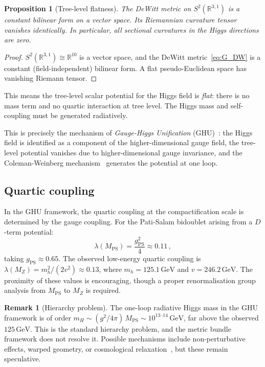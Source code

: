 \documentclass[12pt,a4paper]{article}
\newtheorem{proposition}[theorem]{Proposition}
\theoremstyle{definition}
\newtheorem{remark}[theorem]{Remark}
\newcommand{\R}{\mathbb{R}}
\begin{document}
\begin{proposition}[Tree-level flatness]
\label{prop:flat}
The DeWitt metric on $S^2(\R^{3,1})$ is a \emph{constant} bilinear form on a vector space.
Its Riemannian curvature tensor vanishes identically.
In particular, all sectional curvatures in the Higgs directions are zero.
\end{proposition}

\begin{proof}
$S^2(\R^{3,1}) \cong \R^{10}$ is a vector space, and the DeWitt metric~\eqref{eq:G_DW} is a constant (field-independent) bilinear form.
A flat pseudo-Euclidean space has vanishing Riemann tensor.
\end{proof}

This means the tree-level scalar potential for the Higgs field is \emph{flat}: there is no mass term and no quartic interaction at tree level.
The Higgs mass and self-coupling must be generated radiatively.

This is precisely the mechanism of \emph{Gauge-Higgs Unification} (GHU)~\cite{Hosotani1983,HatanakaHosotani1998}: the Higgs field is identified as a component of the higher-dimensional gauge field, the tree-level potential vanishes due to higher-dimensional gauge invariance, and the Coleman-Weinberg mechanism~\cite{ColemanWeinberg1973} generates the potential at one loop.

\subsection{Quartic coupling}

In the GHU framework, the quartic coupling at the compactification scale is determined by the gauge coupling.
For the Pati-Salam bidoublet arising from a $D$-term potential:
\begin{equation}
\label{eq:quartic}
\lambda(M_{\mathrm{PS}}) = \frac{g_{\mathrm{PS}}^2}{4} \approx 0.11\,,
\end{equation}
taking $g_{\mathrm{PS}} \approx 0.65$.
The observed low-energy quartic coupling is $\lambda(M_Z) = m_h^2/(2v^2) \approx 0.13$, where $m_h = 125.1\,\text{GeV}$ and $v = 246.2\,\text{GeV}$.
The proximity of these values is encouraging, though a proper renormalisation group analysis from $M_{\mathrm{PS}}$ to $M_Z$ is required.

\begin{remark}[Hierarchy problem]
The one-loop radiative Higgs mass in the GHU framework is of order $m_H \sim (g^2/4\pi)\, M_{\mathrm{PS}} \sim 10^{13\text{--}14}\,\text{GeV}$, far above the observed $125\,\text{GeV}$.
This is the standard hierarchy problem, and the metric bundle framework does not resolve it.
Possible mechanisms include non-perturbative effects, warped geometry, or cosmological relaxation~\cite{GrahamKaplanRajendran2015}, but these remain speculative.
\end{remark}
\end{document}
